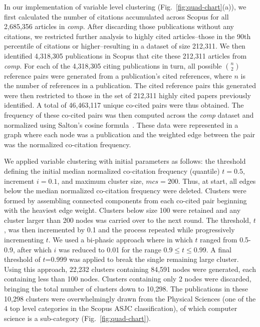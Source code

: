 In our implementation of variable level clustering (Fig.~\ref{fig:quad-chart}(a)), we first calculated the number of citations accumulated across Scopus for all 2,685,356 articles in \emph{comp}. After discarding those publications without any citations, we restricted further analysis to highly cited articles--those in the 90th percentile of citations or higher--resulting in a dataset of size 212,311. We then identified 4,318,305 publications in Scopus that cite these 212,311 articles from \emph{comp}. For each of the 4,318,305 citing publications in turn, all possible ${n \choose 2}$ reference pairs were generated from a publication's cited references, where $n$ is the number of references in a publication. The cited reference pairs this generated were then restricted to those in the set of 212,311 highly cited papers previously identified. A total of 46,463,117 unique co-cited pairs were thus obtained. 
The frequency of these co-cited pairs was then computed across the \emph{comp} dataset  and normalized using Salton's cosine formula~\cite{salton_citation_1979}. These data were represented in a graph where each node was a publication and the weighted edge between the pair was the normalized co-citation frequency. \par 

We applied variable clustering with initial parameters as follows: the threshold defining the initial median normalized co-citation frequency (quantile) $t=0.5$, increment $i = 0.1$, and maximum cluster size, $mcs=200$. Thus, at start, all edges below the median normalized co-citation frequency were deleted. Clusters were formed by assembling connected components from each co-cited pair beginning with the heaviest edge weight. Clusters below size 100 were retained and any cluster larger than 200 nodes was carried over to the next round. The threshold, $t$, was then incremented by 0.1 and the process repeated while progressively incrementing $t$.  We used a bi-phasic approach where in which $t$ ranged from 0.5-0.9, after which $i$ was reduced to 0.01 for the range $0.9 \leq t \leq 0.99$. A final threshold of $t$=0.999 was applied to break the single remaining large cluster.  Using this approach, 22,232 clusters containing 84,591 nodes were generated, each containing less than 100 nodes. Clusters containing only 2 nodes were discarded, bringing the total number of clusters down to 10,298. The publications in these 10,298 clusters were overwhelmingly drawn from the Physical Sciences (one of the 4 top level categories in the Scopus ASJC classification), of which computer science is a sub-category (Fig.~\ref{fig:quad-chart}).

